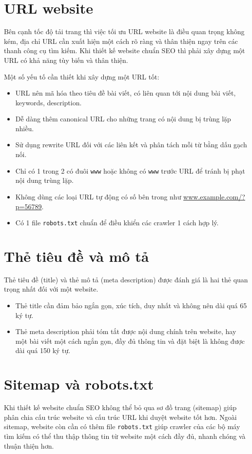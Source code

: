 \section{URL website}
Bên cạnh tốc độ tải trang thì việc tối ưu URL website là điều quan trọng không kém, địa chỉ URL cần xuất hiện một cách rõ ràng và thân thiện ngay trên các thanh công cụ tìm kiếm. Khi thiết kế website chuẩn SEO thì phải xây dựng một URL có khả năng tùy biến và thân thiện.
\\\par
Một số yếu tố cần thiết khi xây dựng một URL tốt:
\begin{itemize}
	\item URL nên mã hóa theo tiêu đề bài viết, có liên quan tới nội dung bài viết, keywords, description.
	\item Dễ dàng thêm canonical URL cho những trang có nội dung bị trùng lặp nhiều.
	\item Sử dụng rewrite URL đối với các liên kết và phân tách mỗi từ bằng dấu gạch nối.
	\item Chỉ có 1 trong 2 có đuôi \texttt{www} hoặc không có \texttt{www} trước URL để tránh bị phạt nội dung trùng lặp.
	\item Không dùng các loại URL tự động có số bên trong như \url{www.example.com/?p=56789}.
	\item Có 1 file \texttt{robots.txt} chuẩn để điều khiển các crawler 1 cách hợp lý.
\end{itemize}
\section{Thẻ tiêu đề và mô tả}
Thẻ tiêu đề (title) và thẻ mô tả (meta description) được đánh giá là hai thẻ quan trọng nhất đối với một website.
\begin{itemize}
	\item Thẻ title cần đảm bảo ngắn gọn, xúc tích, duy nhất và không nên dài quá 65 ký tự.
	\item Thẻ meta description phải tóm tắt được nội dung chính trên website, hay một bài viết một cách ngắn gọn, đầy đủ thông tin và đặt biệt là không được dài quá 150 ký tự.
\end{itemize}
\section{Sitemap và robots.txt}
Khi thiết kế website chuẩn SEO không thể bỏ qua sơ đồ trang (sitemap) giúp phân chia cấu trúc website và cấu trúc URL khi duyệt website tốt hơn. Ngoài sitemap, website còn cần có thêm file \texttt{robots.txt} giúp crawler của các bộ máy tìm kiếm có thể thu thập thông tin từ website một cách đầy đủ, nhanh chóng và thuận thiện hơn.
